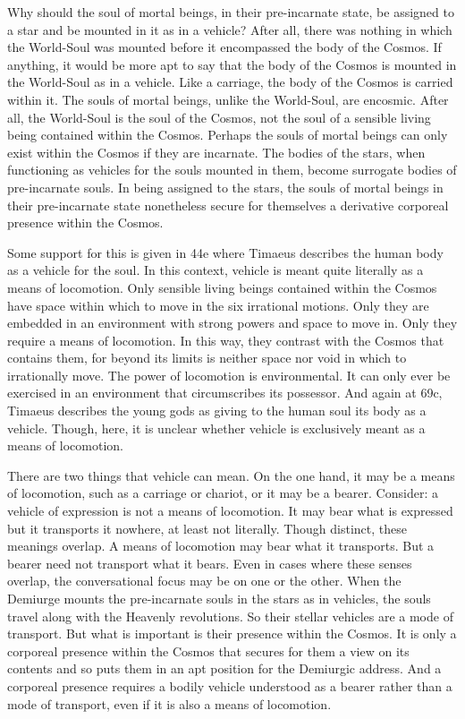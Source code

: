 Why should the soul of mortal beings, in their pre-incarnate state, be assigned to a star and be mounted in it as in a vehicle? After all, there was nothing in which the World-Soul was mounted before it encompassed the body of the Cosmos. If anything, it would be more apt to say that the body of the Cosmos is mounted in the World-Soul as in a vehicle. Like a carriage, the body of the Cosmos is carried within it. The souls of mortal beings, unlike the World-Soul, are encosmic. After all, the World-Soul is the soul of the Cosmos, not the soul of a sensible living being contained within the Cosmos. Perhaps the souls of mortal beings can only exist within the Cosmos if they are incarnate. The bodies of the stars, when functioning as vehicles for the souls mounted in them, become surrogate bodies of pre-incarnate souls. In being assigned to the stars, the souls of mortal beings in their pre-incarnate state nonetheless secure for themselves a derivative corporeal presence within the Cosmos. 

Some support for this is given in 44e where Timaeus describes the human body as a vehicle for the soul. In this context, vehicle is meant quite literally as a means of locomotion. Only sensible living beings contained within the Cosmos have space within which to move in the six irrational motions. Only they are embedded in an environment with strong powers and space to move in. Only they require a means of locomotion. In this way, they contrast with the Cosmos that contains them, for beyond its limits is neither space nor void in which to irrationally move. The power of locomotion is environmental. It can only ever be exercised in an environment that circumscribes its possessor. And again at 69c, Timaeus describes the young gods as giving to the human soul its body as a vehicle. Though, here, it is unclear whether vehicle is exclusively meant as a means of locomotion.

There are two things that vehicle can mean. On the one hand, it may be a means of locomotion, such as a carriage or chariot, or it may be a bearer. Consider: a vehicle of expression is not a means of locomotion. It may bear what is expressed but it transports it nowhere, at least not literally. Though distinct, these meanings overlap. A means of locomotion may bear what it transports. But a bearer need not transport what it bears. Even in cases where these senses overlap, the conversational focus may be on one or the other. When the Demiurge mounts the pre-incarnate souls in the stars as in vehicles, the souls travel along with the Heavenly revolutions. So their stellar vehicles are a mode of transport. But what is important is their presence within the Cosmos. It is only a corporeal presence within the Cosmos that secures for them a view on its contents and so puts them in an apt position for the Demiurgic address. And a corporeal presence requires a bodily vehicle understood as a bearer rather than a mode of transport, even if it is also a means of locomotion.

